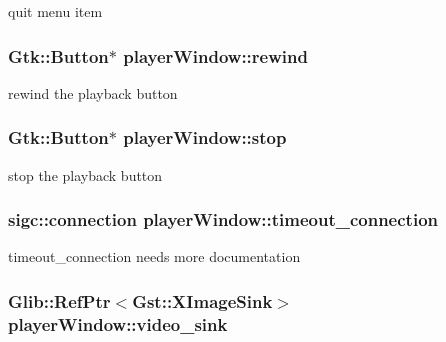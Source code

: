 quit menu item \hypertarget{classplayerWindow_aa32c5da9a017455284386fdc32ab82b4}{
\subsubsection[{rewind}]{\setlength{\rightskip}{0pt plus 5cm}Gtk\-::\-Button$\ast$ player\-Window\-::rewind\hspace{0.3cm}{\ttfamily [protected]}}}\label{classplayerWindow_aa32c5da9a017455284386fdc32ab82b4}
rewind the playback button \hypertarget{classplayerWindow_a45301ae61e21b660c836900e8c0155f6}{
\subsubsection[{stop}]{\setlength{\rightskip}{0pt plus 5cm}Gtk\-::\-Button$\ast$ player\-Window\-::stop\hspace{0.3cm}{\ttfamily [protected]}}}\label{classplayerWindow_a45301ae61e21b660c836900e8c0155f6}
stop the playback button \hypertarget{classplayerWindow_adf7d6a8d1d1da1bbd90fe9cdb8868222}{
\subsubsection[{timeout\-\_\-connection}]{\setlength{\rightskip}{0pt plus 5cm}sigc\-::connection player\-Window\-::timeout\-\_\-connection\hspace{0.3cm}{\ttfamily [protected]}}}\label{classplayerWindow_adf7d6a8d1d1da1bbd90fe9cdb8868222}
timeout\-\_\-connection needs more documentation \hypertarget{classplayerWindow_a70daa606162c5b6639ee701afc44b691}{
\subsubsection[{video\-\_\-sink}]{\setlength{\rightskip}{0pt plus 5cm}Glib\-::\-Ref\-Ptr$<$Gst\-::\-X\-Image\-Sink$>$ player\-Window\-::video\-\_\-sink\hspace{0.3cm}{\ttfamily [protected]}}}\label{classplayerWindow_a70daa606162c5b6639ee701afc44b691}
